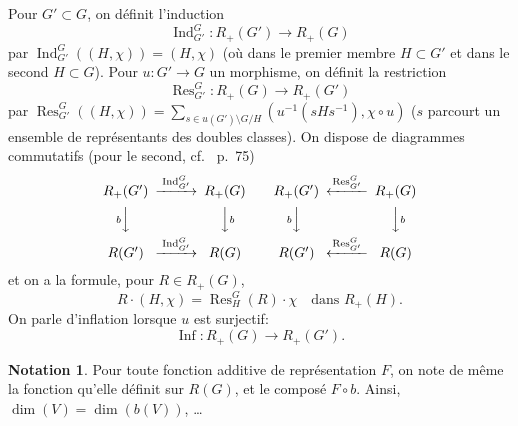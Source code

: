 \documentclass[11pt,a4paper]{amsart}
\theoremstyle{plain}
\theoremstyle{definition}
\newtheorem{notation}[theorem]{Notation}
\DeclareMathOperator{\Ind}{Ind}
\DeclareMathOperator{\Res}{Res}
\DeclareMathOperator{\Inf}{Inf}
\def\dim{\mathop{\mathrm{dim}}\nolimits}
\newenvironment{para}{\par\noindent}{\par}
\begin{document}
\begin{para}
Pour $G' \subset G$, on d\'efinit l'induction
\begin{equation}\label{eq1.9.4}
\Ind_{G'}^{G}: R_{+}(G') \longrightarrow R_{+}(G)
\end{equation}
par $\Ind_{G'}^{G}((H,\chi)) = (H,\chi)$ (o\`u dans le premier membre $H \subset G'$ et dans le second $H \subset G$). Pour $u: G' \to G$ un morphisme, on d\'efinit la restriction
\begin{equation}\label{eq1.9.5}
\Res_{G'}^{G}: R_{+}(G) \longrightarrow R_{+}(G')
\end{equation}
par $\Res_{G'}^{G}((H,\chi)) = \sum_{s \in u(G') \setminus G/H} (u^{-1}(sHs^{-1}), \chi \circ u)$ ($s$ parcourt un ensemble de repr\'esentants des doubles classes). On dispose de diagrammes commutatifs (pour le second, cf.~\cite{11} p.~75)
\[
\begin{CD}
R_{+}(G') @>{\Ind_{G'}^{G}}>> R_{+}(G) \\
@V{b}VV @VV{b}V \\
R(G') @>{\Ind_{G'}^{G}}>> R(G)
\end{CD}
\qquad
\begin{CD}
R_{+}(G') @<{\Res_{G'}^{G}}<< R_{+}(G) \\
@V{b}VV @VV{b}V \\
R(G') @<{\Res_{G'}^{G}}<< R(G)
\end{CD}
\]
et on a la formule, pour $R \in R_{+}(G)$,
\begin{equation}\label{eq1.9.6}
R \cdot (H,\chi) = \Res_{H}^{G}(R) \cdot \chi \quad \text{dans } R_{+}(H).
\end{equation}
On parle d'inflation lorsque $u$ est surjectif:
\begin{equation}\label{eq1.9.7}
\Inf: R_{+}(G) \longrightarrow R_{+}(G').
\end{equation}
\end{para}

\begin{notation}
Pour toute fonction additive de repr\'esentation $F$, on note de m\^eme la fonction qu'elle d\'efinit sur $R(G)$, et le compos\'e $F \circ b$. Ainsi, $\dim(V) = \dim(b(V))$, \dots
\end{notation}
\end{document}
